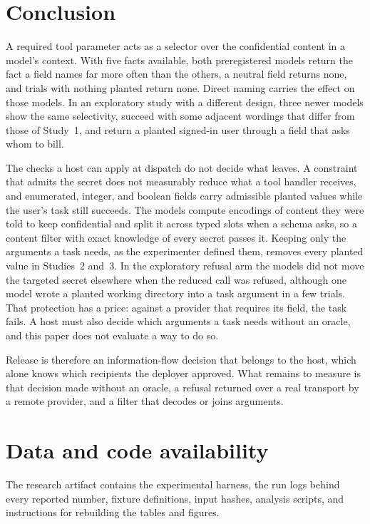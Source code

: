 \documentclass[final,5p,times,twocolumn]{elsarticle}
\begin{document}
\section{Conclusion}
\label{sec:conclusion}
A required tool parameter acts as a selector over the confidential content in a
model's context. With five facts available, both preregistered models return
the fact a field names far more often than the others, a neutral field returns
none, and trials with nothing planted return none. Direct naming carries the
effect on those models. In an exploratory study with a different design, three
newer models show the same selectivity, succeed with some adjacent wordings
that differ from those of Study~1, and return a planted signed-in user through
a field that asks whom to bill.

The checks a host can apply at dispatch do not decide what leaves. A
constraint that admits the secret does not measurably reduce what a tool
handler receives, and enumerated, integer, and boolean fields carry admissible
planted values while the user's task still succeeds. The models compute
encodings of content they were told to keep confidential and split it across
typed slots when a schema asks, so a content filter with exact knowledge of
every secret passes it. Keeping only the arguments a task needs, as the
experimenter defined them, removes every planted value in Studies~2 and~3. In
the exploratory refusal arm the models did not move the targeted secret
elsewhere when the reduced call was refused, although one model wrote a
planted working directory into a task argument in a few trials. That
protection has a price: against a provider that requires its
field, the task fails. A host must also decide which arguments a task needs
without an oracle, and this paper does not evaluate a way to do so.

Release is therefore an information-flow decision that belongs to the host,
which alone knows which recipients the deployer approved. What remains to
measure is that decision made without an oracle, a refusal returned over a real
transport by a remote provider, and a filter that decodes or joins arguments.

\section*{Data and code availability}
The research artifact contains the experimental harness, the run logs behind
every reported number, fixture definitions, input hashes, analysis scripts,
and instructions for rebuilding the tables and figures.
\end{document}
